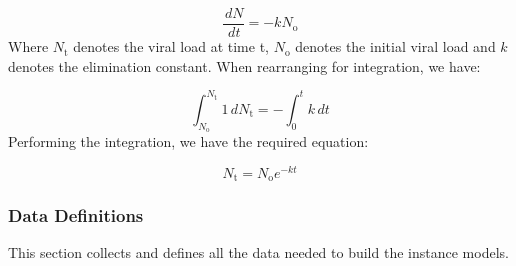 \documentclass[12pt]{article}
\begin{document}
\begin{displaymath}
\frac{\,dN}{\,dt}=-k {N_{\text{o}}}
\end{displaymath}
Where ${N_{\text{t}}}$ denotes the viral load at time t, ${N_{\text{o}}}$ denotes the initial viral load and $k$ denotes the elimination constant. When rearranging for integration,  we have:

\begin{displaymath}
\int_{{N_{\text{o}}}}^{{N_{\text{t}}}}{1}\,d{N_{\text{t}}}=-\int_{0}^{t}{k}\,dt
\end{displaymath}
Performing the integration, we have the required equation:

\begin{displaymath}
{N_{\text{t}}}={N_{\text{o}}} e^{-k t}
\end{displaymath}
\subsubsection{Data Definitions}
\label{Sec:DDs}
This section collects and defines all the data needed to build the instance models.
\end{document}
